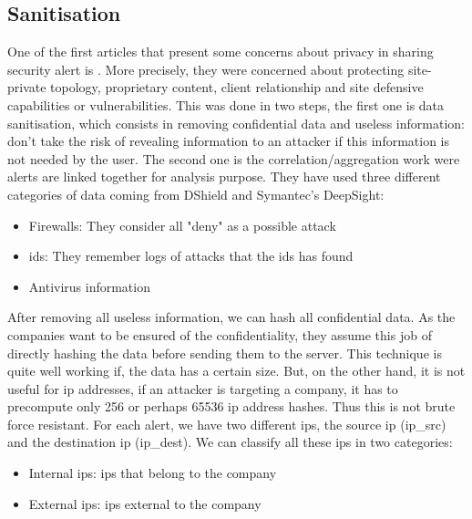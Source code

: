 \documentclass{eplmastersthesis}
\begin{document}
\subsection{Sanitisation}
One of the first articles that present some concerns about privacy in sharing security alert is \cite{lincoln2004privacy}.
More precisely, they were concerned about protecting site-private topology, proprietary content, client relationship and site defensive capabilities or vulnerabilities.
This was done in two steps, the first one is data sanitisation, which consists in removing confidential data and useless information: don't take the risk of revealing information to an attacker if this information is not needed by the user.
The second one is the correlation/aggregation work were alerts are linked together for analysis purpose.
 They have used three different categories of data coming from DShield and Symantec's DeepSight:
\begin{itemize}
\item Firewalls: They consider all "deny" as a possible attack
\item \gls{ids}: They remember logs of attacks that the \gls{ids} has found
\item Antivirus information
\end{itemize}

After removing all useless information, we can hash all confidential data. As the companies want to be ensured of the confidentiality, they assume this job of directly hashing the data before sending them to the server.
This technique is quite well working if, the data has a certain size. But, on the other hand, it is not useful for \gls{ip} addresses, if an attacker is targeting a company, it has to precompute only 256 or perhaps 65536 \gls{ip} address hashes. Thus this is not brute force resistant.
For each alert, we have two different \glspl{ip}, the source \gls{ip} (ip\_src) and the destination \gls{ip} (ip\_dest). We can classify all these \glspl{ip} in two categories:
\begin{itemize}
	\item Internal \glspl{ip}: \glspl{ip} that belong to the company
	\item External \glspl{ip}: \glspl{ip} external to the company
\end{itemize}
\end{document}
